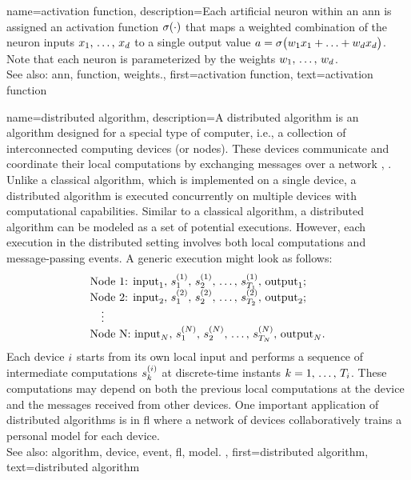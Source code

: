 {name={activation function},
	description={Each artificial neuron within an \gls{ann} is 
		assigned an activation \gls{function} $\sigma(\cdot)$ that maps a weighted combination of 
		the neuron inputs $x_{1}, \,\ldots, \,x_{d}$ to a single output 
		value $a = \sigma\big(w_{1} x_{1}+\ldots+w_{d} x_{d} \big)$. 
		Note that each neuron is parameterized by the \gls{weights} $w_{1}, \,\ldots, \,w_{d}$.
					\\ 
		See also: \gls{ann}, \gls{function}, \gls{weights}.},
	first={activation function},
	text={activation function} 
}

{name={distributed algorithm},
	description={A distributed \gls{algorithm} is an \gls{algorithm} designed for 
		a special type of computer, i.e., a collection of interconnected computing devices (or nodes). 
		These devices communicate and coordinate their local computations by exchanging 
		messages over a network \cite{IntroDistAlg}, \cite{ParallelDistrBook}. Unlike a classical \gls{algorithm}, 
		which is implemented on a single \gls{device}, a distributed \gls{algorithm} is 
		executed concurrently on multiple \glspl{device} with computational capabilities. 
		Similar to a classical \gls{algorithm}, a distributed \gls{algorithm} can be modeled as a 
		set of potential executions. However, each execution in the distributed setting involves 
		both local computations and message-passing \glspl{event}. A generic execution might look as 
		follows:
		\[
		\begin{array}{l}
			\text{Node 1: } {\rm input}_1, \,s_1^{(1)}, \,s_2^{(1)}, \,\ldots, \,s_{T_1}^{(1)}, \,{\rm output}_1; \\
			\text{Node 2: } {\rm input}_2, \,s_1^{(2)}, \,s_2^{(2)}, \,\ldots, \,s_{T_2}^{(2)}, \,{\rm output}_2; \\
			\quad \vdots \\
			\text{Node N: } {\rm input}_N, \,s_1^{(N)}, \,s_2^{(N)}, \,\ldots, \,s_{T_N}^{(N)}, \,{\rm output}_N.
		\end{array}
		\]
		Each \gls{device} $i$ starts from its own local input and performs a sequence of 
		intermediate computations $s_{k}^{(i)}$ at discrete-time instants $k = 1, \,\dots, \,T_i$. 
		These computations may depend on both the previous local computations at the \gls{device} 
		and the messages received from other \glspl{device}. One important application of distributed 
		\glspl{algorithm} is in \gls{fl} where a network of \glspl{device} collaboratively trains a personal \gls{model} 
		for each \gls{device}. 
					\\ 
		See also: \gls{algorithm}, \gls{device}, \gls{event}, \gls{fl}, \gls{model}.
		},
	first={distributed algorithm}, 
	text={distributed algorithm}
}


